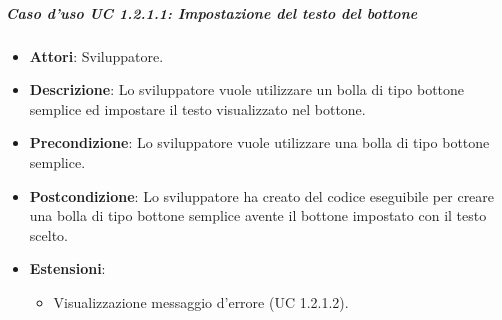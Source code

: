 \subparagraph{Caso d'uso UC 1.2.1.1: Impostazione del testo del bottone}
\FloatBarrier
\begin{itemize}
\item\textbf{Attori}: Sviluppatore.
\item\textbf{Descrizione}: Lo sviluppatore vuole utilizzare un bolla di tipo bottone semplice ed impostare il testo visualizzato nel bottone.
\item\textbf{Precondizione}: Lo sviluppatore vuole utilizzare una bolla di tipo bottone semplice.
\item\textbf{Postcondizione}: Lo sviluppatore ha creato del codice eseguibile per creare una bolla di tipo bottone semplice avente il bottone impostato con il testo scelto.
\item \textbf{Estensioni}: 
\begin{itemize}
\item Visualizzazione messaggio d'errore (UC 1.2.1.2).
\end{itemize}
\end{itemize}

